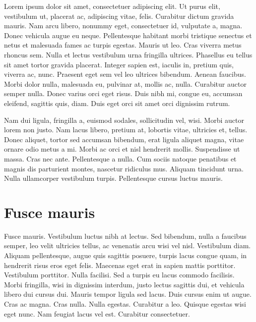   Lorem ipsum dolor sit amet, consectetuer adipiscing elit. Ut purus
  elit, vestibulum ut, placerat ac, adipiscing vitae, felis. Curabitur
  dictum gravida mauris. Nam arcu libero, nonummy eget, consectetuer id,
  vulputate a, magna. Donec vehicula augue eu neque. Pellentesque
  habitant morbi tristique senectus et netus et malesuada fames ac
  turpis egestas. Mauris ut leo. Cras viverra metus rhoncus sem. Nulla
  et lectus vestibulum urna fringilla ultrices. Phasellus eu tellus sit
  amet tortor gravida placerat. Integer sapien est, iaculis in, pretium
  quis, viverra ac, nunc. Praesent eget sem vel leo ultrices
  bibendum. Aenean faucibus. Morbi dolor nulla, malesuada eu, pulvinar
  at, mollis ac, nulla. Curabitur auctor semper nulla.  Donec varius
  orci eget risus. Duis nibh mi, congue eu, accumsan eleifend, sagittis
  quis, diam. Duis eget orci sit amet orci dignissim rutrum.

  Nam dui ligula, fringilla a, euismod sodales, sollicitudin vel,
  wisi. Morbi auctor lorem non justo. Nam lacus libero, pretium at,
  lobortis vitae, ultricies et, tellus. Donec aliquet, tortor sed
  accumsan bibendum, erat ligula aliquet magna, vitae ornare odio metus
  a mi. Morbi ac orci et nisl hendrerit mollis. Suspendisse ut
  massa. Cras nec ante. Pellentesque a nulla.  Cum sociis natoque
  penatibus et magnis dis parturient montes, nascetur ridiculus
  mus. Aliquam tincidunt urna. Nulla ullamcorper vestibulum
  turpis. Pellentesque cursus luctus mauris.

  \section{Fusce mauris}

  Fusce mauris. Vestibulum luctus nibh at lectus. Sed bibendum, nulla a
  faucibus semper, leo velit ultricies tellus, ac venenatis arcu wisi
  vel nisl.  Vestibulum diam. Aliquam pellentesque, augue quis sagittis
  posuere, turpis lacus congue quam, in hendrerit risus eros eget
  felis. Maecenas eget erat in sapien mattis porttitor. Vestibulum
  porttitor. Nulla facilisi.  Sed a turpis eu lacus commodo
  facilisis. Morbi fringilla, wisi in dignissim interdum, justo lectus
  sagittis dui, et vehicula libero dui cursus dui. Mauris tempor ligula
  sed lacus. Duis cursus enim ut augue. Cras ac magna.  Cras
  nulla. Nulla egestas. Curabitur a leo. Quisque egestas wisi eget
  nunc. Nam feugiat lacus vel est. Curabitur consectetuer.

  